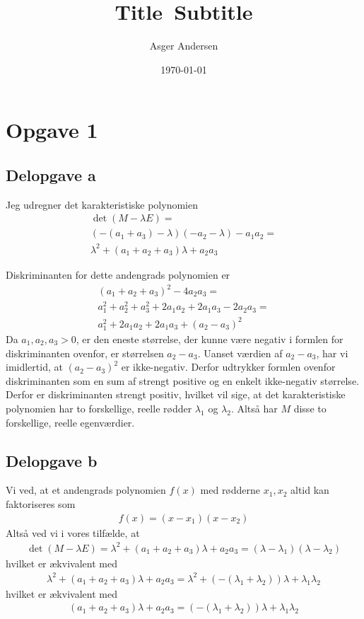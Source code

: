 \documentclass[12pt]{article}
\title{
  Title\
  \large Subtitle
}
\author{Asger Andersen}
\date{\today}
\begin{document}
\section{Opgave 1}

\subsection{Delopgave a}

Jeg udregner det karakteristiske polynomien
\begin{align}
\det(M-\lambda E) = \\ 
(-(a_1 + a_3) - \lambda)(-a_2 - \lambda) - a_1a_2 = \\
\lambda^2 + (a_1 + a_2 + a_3)\lambda + a_2a_3
\end{align}

Diskriminanten for dette andengrads polynomien er
\begin{align}
(a_1 + a_2 + a_3)^2 - 4a_2a_3 = \\ 
a_1^2 + a_2^2 + a_3^2 + 2a_1a_2 + 2a_1a_3 - 2a_2a_3 = \\
a_1^2 + 2a_1a_2 + 2a_1a_3 + (a_2 - a_3)^2
\end{align}
Da $a_1,a_2,a_3>0$, er den eneste størrelse, der kunne være negativ i formlen for diskriminanten ovenfor, er størrelsen $a_2 - a_3$. Uanset værdien af $a_2 - a_3$, har vi imidlertid, at $(a_2 - a_3)^2$ er ikke-negativ. Derfor udtrykker formlen ovenfor diskriminanten som en sum af strengt positive og en enkelt ikke-negativ størrelse. Derfor er diskriminanten strengt positiv, hvilket vil sige, at det karakteristiske polynomien har to forskellige, reelle rødder $\lambda_1$ og $\lambda_2$. Altså har $M$ disse to forskellige, reelle egenværdier.

\subsection{Delopgave b}

Vi ved, at et andengrads polynomien $f(x)$ med rødderne $x_1, x_2$ altid kan faktoriseres som
\begin{align}
f(x) = (x-x_1)(x-x_2)
\end{align}
Altså ved vi i vores tilfælde, at
\begin{align}
\det(M-\lambda E) = \lambda^2 + (a_1 + a_2 + a_3)\lambda + a_2a_3 = (\lambda - \lambda_1)(\lambda - \lambda_2)
\end{align}
hvilket er ækvivalent med
\begin{align}
\lambda^2 + (a_1 + a_2 + a_3)\lambda + a_2a_3 =  \lambda^2 + (-(\lambda_1 + \lambda_2))\lambda + \lambda_1\lambda_2
\end{align}
hvilket er ækvivalent med
\begin{align}
(a_1 + a_2 + a_3)\lambda + a_2a_3 =  (-(\lambda_1 + \lambda_2))\lambda + \lambda_1\lambda_2
\end{align}
\end{document}
